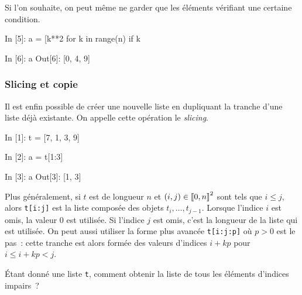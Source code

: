 \documentclass{magnoliaold}
\begin{document}
Si l'on souhaite, on peut même ne garder que les éléments vérifiant une certaine condition. 
\begin{pythoncode}
In [5]: a = [k**2 for k in range(n) if k %

In [6]: a
Out[6]: [0, 4, 9]  
\end{pythoncode}


\subsubsection{Slicing et copie}

Il est enfin possible de créer une nouvelle liste en dupliquant la tranche d'une liste déjà existante. On appelle
cette opération le \emph{slicing}.

\begin{pythoncode}
In [1]: t = [7, 1, 3, 9]

In [2]: a = t[1:3]

In [3]: a
Out[3]: [1, 3]
\end{pythoncode}

\noindent
Plus généralement, si $t$ est de longueur $n$ et $(i, j)\in\left\llbracket 0,n\right\rrbracket^2$ sont tels que $i\leq j$,
alors \verb_t[i:j]_ est la liste composée des objets $t_i, \ldots, t_{j-1}$. Lorsque l'indice
$i$ est omis, la valeur 0 est utilisée. Si
l'indice $j$ est omis, c'est la longueur de la liste qui est utilisée. On peut
aussi utiliser la forme plus avancée \verb!t[i:j:p]! où $p>0$ est le pas~:
cette tranche est alors formée des valeurs d'indices $i+kp$ pour $i\leq i+kp<j$.

\vspace{2ex}
\begin{exoUnique}
\exo Étant donné une liste \verb!t!, comment obtenir la liste de tous les éléments d'indices
  impairs~?
\end{exoUnique}
\vspace{2ex}
\end{document}
